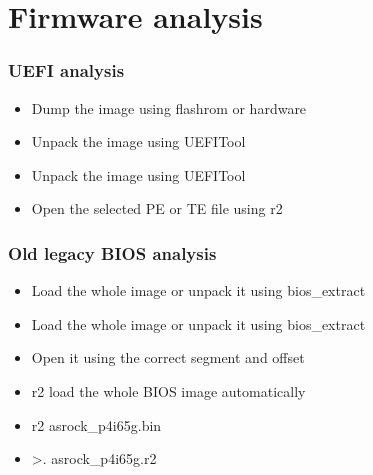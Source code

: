 \documentclass[10pt,pdf,utf8,english,compress,hyperref={unicode}]{beamer}
\begin{document}
\section{Firmware analysis}
\begin{frame}[fragile]
  \frametitle{UEFI analysis}
  \begin{itemize}
    \item Dump the image using flashrom or hardware
\ifxetex
	\item Unpack the image using UEFITool
\else
	\item Unpack the image using UEFITool 
\fi
	\item Open the selected PE or TE file using r2
  \end{itemize}
\end{frame}


\begin{frame}[fragile]
  \frametitle{Old legacy BIOS analysis}
  \begin{itemize}
\ifxetex
	\item Load the whole image or unpack it using bios\_extract
\else
    \item Load the whole image or unpack it using bios\_extract 
\fi
	\item Open it using the correct segment and offset
	\item r2 load the whole BIOS image automatically
	\item r2 asrock\_p4i65g.bin
	\item >. asrock\_p4i65g.r2
  \end{itemize}
\end{frame}
\end{document}
